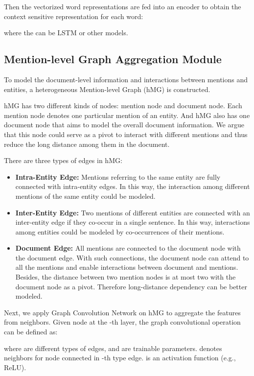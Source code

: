 \documentclass[11pt,a4paper]{article}
\begin{document}
Then the vectorized word representations are fed into an encoder to obtain the context sensitive representation for each word:

where the  can be LSTM or other models.

\subsection{Mention-level Graph Aggregation Module\label{ssec:aggregation}}
To model the document-level information and interactions between mentions and entities, a heterogeneous Mention-level Graph (hMG) is constructed.


hMG has two different kinds of nodes: mention node and document node. Each mention node denotes one particular mention of an entity.
And hMG also has one document node that aims to model the overall document information. We argue that this node could serve as a pivot to interact with different mentions and thus reduce the long distance among them in the document.


There are three types of edges in hMG:
\begin{itemize}
    \item \textbf{Intra-Entity Edge:} Mentions referring to the same entity are fully connected with intra-entity edges. In this way, the interaction among different mentions of the same entity could be modeled.
 
    \item \textbf{Inter-Entity Edge:} Two mentions of different entities are connected with an inter-entity edge if they co-occur in a single sentence. In this way, interactions among entities could be modeled by co-occurrences of their mentions. 
\item \textbf{Document Edge:} All mentions are connected to the document node with the document edge. With such connections, the document node can attend to all the mentions and enable interactions between document and mentions. Besides, the distance between two mention nodes is at most two with the document node as a pivot. Therefore long-distance dependency can be better modeled.
\end{itemize}




Next, we apply Graph Convolution Network \citep{kipf2017semi} on hMG to aggregate the features from neighbors. Given node  at the -th layer, the graph convolutional operation can be defined as:

where  are different types of edges,  and  are trainable parameters.
 denotes neighbors for node  connected in -th type edge.
 is an activation function (e.g., ReLU).
\end{document}
